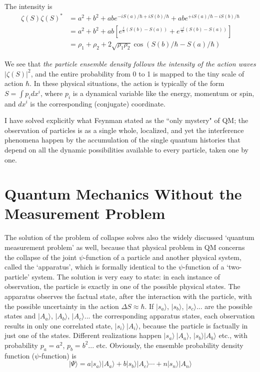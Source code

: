 The intensity is
\begin{align*}
\zeta (S) \zeta (S)^{\ast} & = a^2 + b^2 + abe^{-iS (a) /\hbar + iS (b)/\hbar} + abe^{+ iS (a)/\hbar - iS (b)/\hbar}\tag{29}\label{c14-eq29}  \\
& = a^2 + b^2 + ab \left[e^{\frac{i}{\hbar} (S(b) - S(a))} + e^{\frac{-i}{\hbar}(S(b) - S (a))} \right] \\
& = \rho_1 + \rho_2 + 2 \sqrt{\rho_1 \rho_2} \cos  (S (b) / \hbar - S (a) / \hbar) \tag{30}\label{c14-eq30}
\end{align*}

We see that \textit{the particle ensemble density follows the intensity of the action waves} $|\zeta(S)|^2$,
and the entire probability from 0 to 1 is mapped to the tiny scale of action $\hbar$. In these physical
situations, the action is typically of the form $S = \int p_i dx^i$, where $p_i$ is a dynamical variable
like the energy, momentum or spin, and $dx^i$ is the corresponding (conjugate) coordinate.

I have solved explicitly what Feynman stated as the ``only mystery" of QM; the observation of
 particles is as a single whole, localized, and yet the interference phenomena happen
by the accumulation of the single quantum histories that depend on all the dynamic possibilities available to every particle, taken one by one.

\section{Quantum Mechanics Without the\\ Measurement Problem}\label{c14-sec6}

The solution of the problem of collapse solves also the widely discussed `quantum measurement problem' \cite{chap14-key8} as well, because that physical problem in QM concerns the collapse of the joint $\psi$-function of a particle and another physical system, called the `apparatus', which is
formally identical to the $\psi$-function of a `two-particle' system. The solution is very easy to
state: in each instance of observation, the particle is exactly in one of the possible physical
states. The apparatus observes the factual state, after the interaction with the particle,
with the possible uncertainty in the action $\Delta S \approx \hbar$. If $|s_a  \rangle$, $|s_b\rangle$, $|s_c\rangle...$ are the possible
states and $|A_a \rangle$, $|A_b \rangle$, $|A_c \rangle ...$ the corresponding apparatus states, each observation results in
only one correlated state, $|s_i \rangle ~|A_i \rangle$, because the particle is factually in just one of the states.
Different realizations happen $|s_a \rangle ~ |A_a  \rangle$, $|s_b  \rangle | A_b \rangle$ etc., with probability $p_a = a^2$, $p_b = b^2 ...$ etc.
Obviously, the ensemble probability density function ($\psi$-function) is
\begin{equation*}
|\Psi \rangle = a | s_a \rangle | A_a \rangle + b |s_b \rangle | A_c \rangle \cdots + n | s_n \rangle | A_n \rangle \tag{31}\label{c14-eq31}
\end{equation*}

